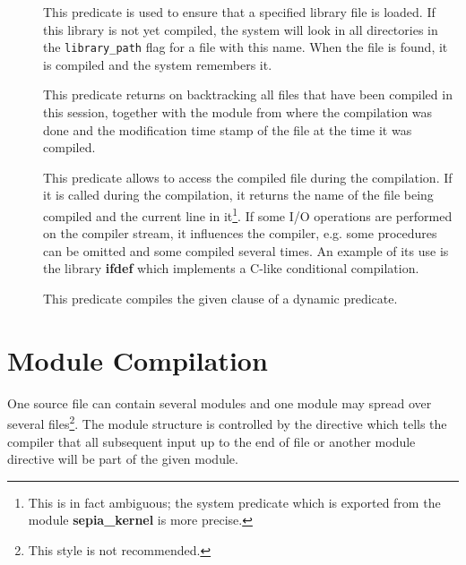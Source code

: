 \begin{description}
\item[] 
This predicate is used to ensure that a specified library
file is loaded.
If this library is not yet compiled, the system will look
in all directories in the {\tt library_path} flag for
a file with this name.
When the file is found, it is compiled and the system remembers it.

\item[] 
This predicate returns on backtracking all files that have been compiled
in this session, together with the module from where the compilation was
done and the modification time stamp of the file at the time it was compiled.

\item[] 
This predicate allows to access the compiled file during the compilation.
If it is called during the compilation, it returns the name
of the file being compiled and the current line in it\footnote{
This is in fact ambiguous; the system predicate 
which is exported from the module {\bf sepia_kernel}
is more precise.}.
If some I/O operations are performed on the compiler stream,
it influences the compiler, e.g. some procedures can be omitted
and some compiled several times.
An example of its use is the library {\bf ifdef}
which implements a C-like conditional compilation.

\item[] 
This predicate compiles the given clause of a dynamic predicate.
\end{description}

\section{Module Compilation}
One source file can contain several modules and one module
may spread over several files\footnote{This style is not recommended.}.
The module structure is controlled by the 
directive which tells the compiler that all subsequent input
up to the end of file or another module directive will
be part of the given module.

